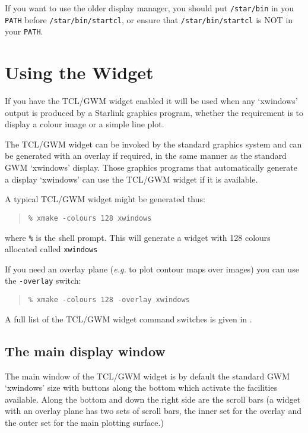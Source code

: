 If you want to use the older display manager, you should put {\tt{/star/bin}}
in you {\tt{PATH}} before {\tt{/star/bin/startcl}}, or ensure that
{\tt{/star/bin/startcl}} is NOT in your {\tt{PATH}}.

\section{\label{using_the_widget}Using the Widget}

If you have the TCL/GWM widget enabled it will be used when any `xwindows' 
output is produced by a Starlink graphics program, whether the requirement
is to display a colour image or a simple line plot.  

The TCL/GWM widget can be invoked by the standard graphics system and can
be generated with an overlay if required, in the same manner as the
standard GWM `xwindows' display.  Those graphics programs that automatically
generate a display `xwindows' can use the TCL/GWM widget if it is available.

A typical TCL/GWM widget might be generated thus:

\begin{quote}
{\tt \% xmake -colours 128 xwindows}
\end{quote}

where {\tt{\%}} is the shell prompt.  This will generate a widget with 
128 colours allocated called {\tt{xwindows}}

If you need an overlay plane ({\em{e.g.}}\/ to plot contour maps over images)
you can use the {\tt{-overlay}} switch:

\begin{quote}
{\tt \% xmake -colours 128 -overlay xwindows}
\end{quote}

A full list of the TCL/GWM widget command switches is given in 
.

\subsection{\label{the_main_display_window}The  main display window}

The main window of the TCL/GWM widget is by default the standard GWM
`xwindows' size with buttons along the bottom which activate the
facilities available.  Along the bottom and down the right side are the
scroll bars (a widget with an overlay plane has two sets of scroll
bars, the inner set for the overlay and the outer set for the main
plotting surface.)

